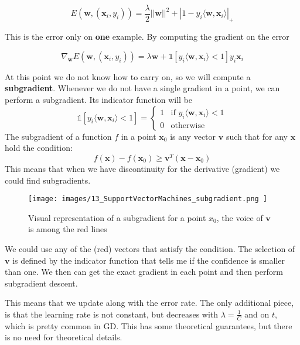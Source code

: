 \[
	E(\pmb{w}, (\pmb{x}_{i}, y_{i})) = \frac{\lambda}{2}||\pmb{w}||^{2}+ |1 - y_{i}
	\langle \pmb{w}, \pmb{x}_{i}\rangle|_{+}
\]

This is the error only on \textbf{one} example. By computing the gradient on the
error

\[
	\nabla_{\pmb{w}}E(\pmb{w}, (\pmb{x}_{i}, y_{i})) = \lambda \pmb{w}+ \mathbb{1}[
	y_{i}\langle \pmb{w}, \pmb{x}_{i}\rangle < 1] y_{i}\pmb{x}_{i}
\]

At this point we do not know how to carry on, so we will compute a \textbf{subgradient}.
Whenever we do not have a single gradient in a point, we can perform a subgradient.
Its indicator function will be
\[
	\mathbb{1}[y_{i}\langle \pmb{w}, \pmb{x}_{i}\rangle < 1] =
	\begin{cases}
		1 & \text{if }y_{i}\langle \pmb{w}, \pmb{x}_{i}\rangle < 1 \\
		0 & \text{otherwise}
	\end{cases}
\]
The subgradient of a function $f$ in a point $\pmb{x}_{0}$ is any vector
$\pmb{v}$ such that for any $\pmb{x}$ hold the condition:
\[
	f(\pmb{x}) - f(\pmb{x}_{0}) \geq \pmb{v}^{T}(\pmb{x}- \pmb{x}_{0})
\]
This means that when we have discontinuity for the derivative (gradient) we could
find subgradients.
\begin{figure}[H]
	\centering
	\texttt{[image: 
        images/13\_SupportVectorMachines\_subgradient.png
    ]}
	\caption{Visual representation of a subgradient for a point $x_{0}$, the voice
	of $\pmb{v}$ is among the red lines}
	\label{fig:subgradient}
\end{figure}
We could use any of the (red) vectors that satisfy the condition. The selection of
$\pmb{v}$ is defined by the indicator function that tells me if the confidence is
smaller than one. We then can get the exact gradient in each point and then
perform subgradient descent.

This means that we update along with the error rate. The only additional piece,
is that the learning rate is not constant, but decreases with $\lambda = \frac{1}{C}$
and on $t$, which is pretty common in GD. This has some theoretical guarantees,
but there is no need for theoretical details.\\
